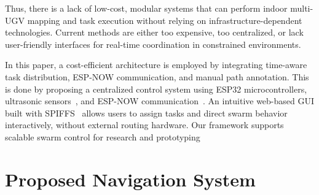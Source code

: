 \documentclass[conference]{IEEEtran}
\begin{document}
Thus, there is a lack of low-cost, modular systems that can perform indoor multi-UGV mapping and task execution without relying on infrastructure-dependent technologies. Current methods are either too expensive, too centralized, or lack user-friendly interfaces for real-time coordination in constrained environments.


In this paper, a cost-efficient architecture is employed by integrating time-aware task distribution, ESP-NOW communication, and manual path annotation. 
This is done by proposing a centralized control system using ESP32 microcontrollers, ultrasonic sensors~\cite{arduino_hcsr04}, and ESP-NOW communication~\cite{espnowguide}. An intuitive web-based GUI built with SPIFFS~\cite{randomnerd2024esp32} allows users to assign tasks and direct swarm behavior interactively, without external routing hardware. Our framework supports scalable swarm control for research and prototyping~\cite{jin2024multi, mdpi2022hierarchical}

\section{Proposed Navigation System}
\label{sec:proposed-system}
\end{document}

